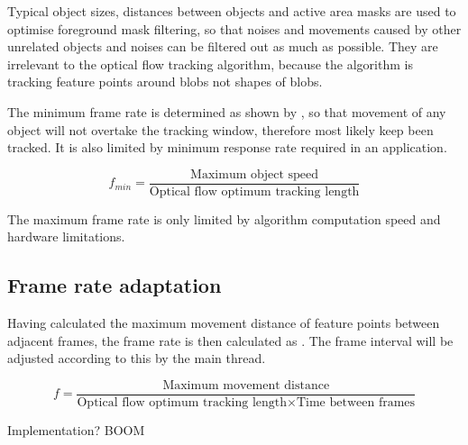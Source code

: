 Typical object sizes, distances between objects and active area masks are used to optimise foreground mask filtering, so that noises and movements caused by other unrelated objects and noises can be filtered out as much as possible. They are irrelevant to the optical flow tracking algorithm, because the algorithm is tracking feature points around blobs not shapes of blobs.

The minimum frame rate is determined as shown by , so that movement of any object will not overtake the tracking window, therefore most likely keep been tracked. It is also limited by minimum response rate required in an application.

\begin{equation}
	f_{min} = \frac{\text{Maximum object speed}}{\text{Optical flow optimum tracking length}}
	\label{f_min}
\end{equation}

The maximum frame rate is only limited by algorithm computation speed and hardware limitations.

\subsection{Frame rate adaptation}

Having calculated the maximum movement distance of feature points between adjacent frames, the frame rate is then calculated as . The frame interval will be adjusted according to this by the main thread.

\begin{equation}
	f = \frac{\text{Maximum movement distance}}{\text{Optical flow optimum tracking length} \times \text{Time between frames}}
	\label{f_rate}
\end{equation}

{\color{red}Implementation? BOOM}
